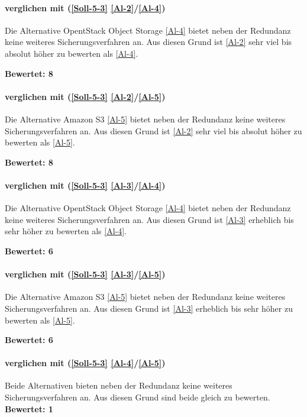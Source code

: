 \paragraph*{  verglichen mit  (\ref{Soll-5-3} \ref{Al-2}/\ref{Al-4})}
Die Alternative OpentStack Object Storage \ref{Al-4} bietet neben der Redundanz keine weiteres Sicherungsverfahren an. Aus diesen Grund ist  \ref{Al-2} sehr viel bis absolut höher zu bewerten als  \ref{Al-4}.

\textbf{Bewertet: 8}

\paragraph*{  verglichen mit  (\ref{Soll-5-3} \ref{Al-2}/\ref{Al-5})}
Die Alternative Amazon S3 \ref{Al-5} bietet neben der Redundanz keine weiteres Sicherungsverfahren an. Aus diesen Grund ist  \ref{Al-2} sehr viel bis absolut höher zu bewerten als  \ref{Al-5}.

\textbf{Bewertet: 8}

\paragraph*{  verglichen mit  (\ref{Soll-5-3} \ref{Al-3}/\ref{Al-4})}
Die Alternative OpentStack Object Storage \ref{Al-4} bietet neben der Redundanz keine weiteres Sicherungsverfahren an. Aus diesen Grund ist  \ref{Al-3} erheblich bis sehr höher zu bewerten als  \ref{Al-4}.

\textbf{Bewertet: 6}

\paragraph*{  verglichen mit  (\ref{Soll-5-3} \ref{Al-3}/\ref{Al-5})}
Die Alternative Amazon S3 \ref{Al-5} bietet neben der Redundanz keine weiteres Sicherungsverfahren an. Aus diesen Grund ist  \ref{Al-3} erheblich bis sehr höher zu bewerten als  \ref{Al-5}.

\textbf{Bewertet: 6}


\paragraph*{  verglichen mit  (\ref{Soll-5-3} \ref{Al-4}/\ref{Al-5})}
Beide Alternativen bieten neben der Redundanz keine weiteres Sicherungsverfahren an. Aus diesen Grund sind beide gleich zu bewerten.
\textbf{Bewertet: 1}

